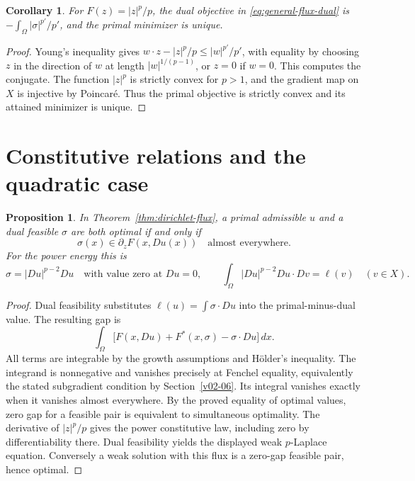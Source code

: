 \documentclass[11pt,oneside,openany]{book}
\theoremstyle{plain}
\newtheorem{proposition}[theorem]{Proposition}
\newtheorem{corollary}[theorem]{Corollary}
\theoremstyle{definition}
\theoremstyle{remark}
\begin{document}
\begin{corollary}\label{cor:p-dirichlet-flux}
For \(F(z)=|z|^p/p\), the dual objective in
\eqref{eq:general-flux-dual} is
\(-\int_\Omega |\sigma|^{p'}/p'\), and the primal minimizer
is unique.
\end{corollary}
\begin{proof}
Young's inequality gives \(w\cdot z-|z|^p/p\le |w|^{p'}/p'\),
with equality by choosing \(z\) in the direction of \(w\) at
length \(|w|^{1/(p-1)}\), or \(z=0\) if \(w=0\).
This computes the conjugate. The function \(|z|^p\) is
strictly convex for \(p>1\), and the gradient map on \(X\)
is injective by Poincar\'e. Thus the primal objective is
strictly convex and its attained minimizer is unique.
\end{proof}

\section{Constitutive relations and the quadratic case}
\label{v09-03}

\begin{proposition}\label{prop:optimal-flux}
In Theorem~\ref{thm:dirichlet-flux}, a primal admissible \(u\)
and a dual feasible \(\sigma\) are both optimal if and only if
\[
 \sigma(x)\in\partial_z F(x,Du(x))\quad\text{almost everywhere}.
\]
For the power energy this is
\[
 \sigma=|Du|^{p-2}Du
 \quad\text{with value zero at }Du=0,
 \qquad
 \int_\Omega |Du|^{p-2}Du\cdot Dv=\ell(v)\quad(v\in X).
\]
\end{proposition}
\begin{proof}
Dual feasibility substitutes \(\ell(u)=\int\sigma\cdot Du\)
into the primal-minus-dual value. The resulting gap is
\[
 \int_\Omega
   \bigl[F(x,Du)+F^*(x,\sigma)-\sigma\cdot Du\bigr]\,dx.
\]
All terms are integrable by the growth assumptions and
H\"older's inequality. The integrand is nonnegative and
vanishes precisely at Fenchel equality, equivalently the
stated subgradient condition by Section~\ref{v02-06}.
Its integral vanishes exactly when it vanishes almost
everywhere. By the proved equality of optimal values,
zero gap for a feasible pair is equivalent to simultaneous
optimality. The derivative of \(|z|^p/p\) gives the power
constitutive law, including zero by differentiability there.
Dual feasibility yields the displayed weak \(p\)-Laplace
equation. Conversely a weak solution with this flux is
a zero-gap feasible pair, hence optimal.
\end{proof}
\end{document}

